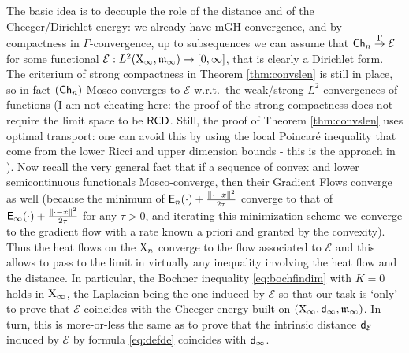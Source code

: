 \documentclass[11pt]{article}
\numberwithin{equation}{section}
\newcommand{\X}{{\rm X}}
\newcommand{\sfd}{{\sf d}}
\newcommand{\mm}{{\mathfrak m}}
\newcommand{\RCD}{{\sf RCD}}
\newcommand{\ch}{{\sf Ch}}
\newcommand{\E}{{\sf E}} %
\begin{document}
{{The basic idea  is to decouple the role of the distance and of the Cheeger/Dirichlet energy: we already have mGH-convergence, and by compactness in $\Gamma$-convergence, up to subsequences we can assume that $\ch_n\stackrel{\Gamma}\to \mathcal E$ for some functional $\mathcal E:L^2(\X_\infty,\mm_\infty)\to[0,\infty]$, that is clearly a Dirichlet form.  The criterium of strong compactness in Theorem \ref{thm:convslen} is still in place, so in fact $(\ch_n)$ Mosco-converges to $\mathcal E$ w.r.t.\ the weak/strong $L^2$-convergences of functions (I am not cheating here: the proof of the strong compactness does not require the limit space to be $\RCD$. Still, the proof of Theorem  \ref{thm:convslen} uses optimal transport: one can avoid this by using the local Poincar\'e inequality that come from the lower Ricci and upper dimension bounds - this is the approach in \cite{CMTkatoI}).  Now recall the  very general fact that if a sequence of convex and lower semicontinuous functionals Mosco-converge, then their Gradient Flows converge as well (because the minimum of $\E_n(\cdot)+\tfrac{\|\cdot-x\|^2}{2\tau}$ converge to that of $\E_\infty(\cdot)+\tfrac{\|\cdot-x\|^2}{2\tau}$ for any $\tau>0$, and iterating this minimization scheme we converge to the gradient flow with a rate known a priori and granted by the convexity). Thus the heat flows on the $\X_n$ converge to the flow associated to $\mathcal E$ and this allows to pass to the limit in virtually any inequality involving the heat flow and the distance. In particular, the Bochner inequality \eqref{eq:bochfindim} with $K=0$ holds in $\X_\infty$, the Laplacian being the one induced by $\mathcal E$ so that our task is `only' to prove that $\mathcal E$ coincides with the Cheeger energy built on $(\X_\infty,\sfd_\infty,\mm_\infty)$. In turn, this is more-or-less the same as to prove that the intrinsic distance $\sfd_{\mathcal E}$ induced by $\mathcal E$ by formula \eqref{eq:defde} coincides with $\sfd_\infty$.

}}
\end{document}
